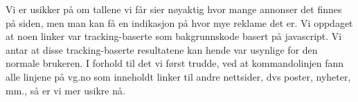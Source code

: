 \documentclass[a4paper, norsk, 12pt]{article}
\begin{document}
Vi er usikker på om tallene vi får sier nøyaktig hvor mange annonser det finnes på siden, men man kan få en indikasjon på hvor mye reklame det er. Vi oppdaget at noen linker var tracking-baserte som bakgrunnskode basert på javascript. Vi antar at disse tracking-baserte resultatene kan hende var usynlige for den normale brukeren. I forhold til det vi først trudde, ved at kommandolinjen fann alle linjene på vg.no som inneholdt linker til andre nettsider, dvs poster, nyheter, mm., så er vi mer usikre nå. 

%

\end{document}
